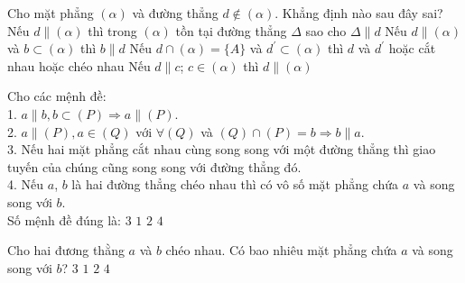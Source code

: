 \begin{ex}%
Cho mặt phẳng $(\alpha)$ và đường thẳng $d \notin(\alpha)$. Khẳng định nào sau đây sai?
\choice
{Nếu $d \parallel (\alpha)$ thì trong $(\alpha)$ tồn tại đường thẳng $\Delta$ sao cho $\Delta \parallel  d$}
{\True Nếu $d \parallel (\alpha)$ và $b \subset(\alpha)$ thì $b \parallel  d$}
{Nếu $d \cap(\alpha)=\{A\}$ và $d^{\prime} \subset(\alpha)$ thì $d$ và $d^{\prime}$ hoặc cắt nhau hoặc chéo nhau}
{Nếu $d \parallel  c $; $ c \in(\alpha)$ thì $d \parallel (\alpha)$}
\end{ex}

\begin{ex}%
Cho các mệnh đề:\\
1. $a \parallel  b, b \subset(P) \Rightarrow a \parallel (P)$.\\
2. $a \parallel (P), a \in(Q)$ với $\forall(Q)$ và $(Q) \cap(P)=b \Rightarrow b \parallel  a$.\\
3. Nếu hai mặt phẳng cắt nhau cùng song song với một đường thẳng thì giao tuyến của chúng cũng song song với đường thẳng đó.\\
4. Nếu $a$, $b$ là hai đường thẳng chéo nhau thì có vô số mặt phẳng chứa $a$ và song song với $b$. \\
Số mệnh đề đúng là:
\choice
{\True $3$}
{$1$}
{$2$}
{$4$}
\end{ex}

\begin{ex}%
Cho hai đương thằng $a$ và $b$ chéo nhau. Có bao nhiêu mặt phẳng chứa $a$ và song song với $b$?
\choice
{$3$}
{\True $1$}
{$2$}
{$4$}
\end{ex}



